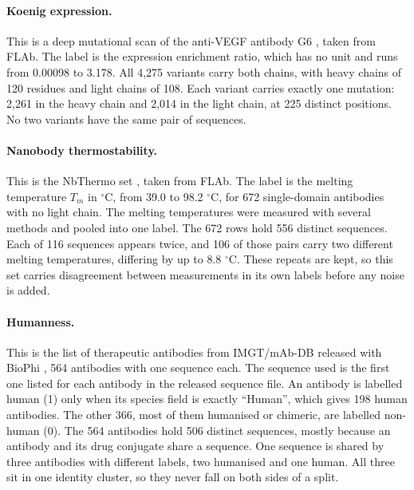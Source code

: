 \paragraph{Koenig expression.} This is a deep mutational scan of the anti-VEGF antibody G6 \citep{Koenig2017}, taken from FLAb. The label is the expression enrichment ratio, which has no unit and runs from 0.00098 to 3.178. All 4,275 variants carry both chains, with heavy chains of 120 residues and light chains of 108. Each variant carries exactly one mutation: 2,261 in the heavy chain and 2,014 in the light chain, at 225 distinct positions. No two variants have the same pair of sequences.

\paragraph{Nanobody thermostability.} This is the NbThermo set \citep{ValdesTresanco2023}, taken from FLAb. The label is the melting temperature $T_m$ in $^\circ$C, from 39.0 to 98.2 $^\circ$C, for 672 single-domain antibodies with no light chain. The melting temperatures were measured with several methods and pooled into one label. The 672 rows hold 556 distinct sequences. Each of 116 sequences appears twice, and 106 of those pairs carry two different melting temperatures, differing by up to 8.8 $^\circ$C. These repeats are kept, so this set carries disagreement between measurements in its own labels before any noise is added.

\paragraph{Humanness.} This is the list of therapeutic antibodies from IMGT/mAb-DB released with BioPhi \citep{Prihoda2022}, 564 antibodies with one sequence each. The sequence used is the first one listed for each antibody in the released sequence file. An antibody is labelled human (1) only when its species field is exactly ``Human'', which gives 198 human antibodies. The other 366, most of them humanised or chimeric, are labelled non-human (0). The 564 antibodies hold 506 distinct sequences, mostly because an antibody and its drug conjugate share a sequence. One sequence is shared by three antibodies with different labels, two humanised and one human. All three sit in one identity cluster, so they never fall on both sides of a split.

